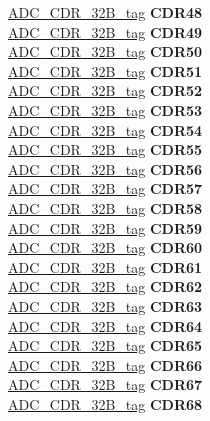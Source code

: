 \begin{DoxyCompactItemize}
\begin{tabbing}
\>\>\mbox{\hyperlink{unionADC__CDR__32B__tag}{ADC\_CDR\_32B\_tag}} {\bfseries CDR48}\\
\>\>\mbox{\hyperlink{unionADC__CDR__32B__tag}{ADC\_CDR\_32B\_tag}} {\bfseries CDR49}\\
\>\>\mbox{\hyperlink{unionADC__CDR__32B__tag}{ADC\_CDR\_32B\_tag}} {\bfseries CDR50}\\
\>\>\mbox{\hyperlink{unionADC__CDR__32B__tag}{ADC\_CDR\_32B\_tag}} {\bfseries CDR51}\\
\>\>\mbox{\hyperlink{unionADC__CDR__32B__tag}{ADC\_CDR\_32B\_tag}} {\bfseries CDR52}\\
\>\>\mbox{\hyperlink{unionADC__CDR__32B__tag}{ADC\_CDR\_32B\_tag}} {\bfseries CDR53}\\
\>\>\mbox{\hyperlink{unionADC__CDR__32B__tag}{ADC\_CDR\_32B\_tag}} {\bfseries CDR54}\\
\>\>\mbox{\hyperlink{unionADC__CDR__32B__tag}{ADC\_CDR\_32B\_tag}} {\bfseries CDR55}\\
\>\>\mbox{\hyperlink{unionADC__CDR__32B__tag}{ADC\_CDR\_32B\_tag}} {\bfseries CDR56}\\
\>\>\mbox{\hyperlink{unionADC__CDR__32B__tag}{ADC\_CDR\_32B\_tag}} {\bfseries CDR57}\\
\>\>\mbox{\hyperlink{unionADC__CDR__32B__tag}{ADC\_CDR\_32B\_tag}} {\bfseries CDR58}\\
\>\>\mbox{\hyperlink{unionADC__CDR__32B__tag}{ADC\_CDR\_32B\_tag}} {\bfseries CDR59}\\
\>\>\mbox{\hyperlink{unionADC__CDR__32B__tag}{ADC\_CDR\_32B\_tag}} {\bfseries CDR60}\\
\>\>\mbox{\hyperlink{unionADC__CDR__32B__tag}{ADC\_CDR\_32B\_tag}} {\bfseries CDR61}\\
\>\>\mbox{\hyperlink{unionADC__CDR__32B__tag}{ADC\_CDR\_32B\_tag}} {\bfseries CDR62}\\
\>\>\mbox{\hyperlink{unionADC__CDR__32B__tag}{ADC\_CDR\_32B\_tag}} {\bfseries CDR63}\\
\>\>\mbox{\hyperlink{unionADC__CDR__32B__tag}{ADC\_CDR\_32B\_tag}} {\bfseries CDR64}\\
\>\>\mbox{\hyperlink{unionADC__CDR__32B__tag}{ADC\_CDR\_32B\_tag}} {\bfseries CDR65}\\
\>\>\mbox{\hyperlink{unionADC__CDR__32B__tag}{ADC\_CDR\_32B\_tag}} {\bfseries CDR66}\\
\>\>\mbox{\hyperlink{unionADC__CDR__32B__tag}{ADC\_CDR\_32B\_tag}} {\bfseries CDR67}\\
\>\>\mbox{\hyperlink{unionADC__CDR__32B__tag}{ADC\_CDR\_32B\_tag}} {\bfseries CDR68}\\

\end{tabbing}
\end{DoxyCompactItemize}
